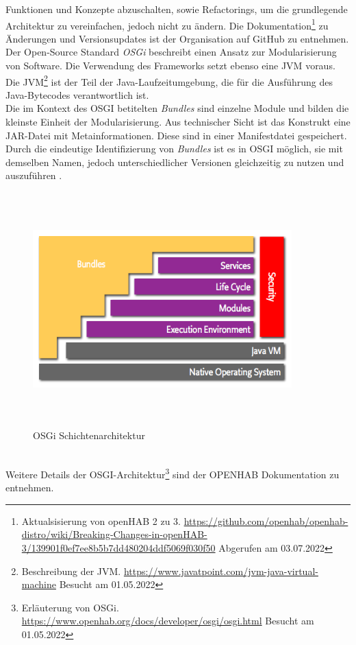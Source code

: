    Funktionen und Konzepte abzuschalten, sowie Refactorings, um die grundlegende Architektur zu vereinfachen, jedoch nicht zu ändern. 
    Die Dokumentation\footnote{Aktualsisierung von openHAB 2 zu 3. \url{https://github.com/openhab/openhab-distro/wiki/Breaking-Changes-in-openHAB-3/139901f0ef7ee8b5b7dd480204ddf5069f030f50} Abgerufen am 03.07.2022} 
    zu Änderungen und Versionsupdates ist der Organisation auf GitHub zu entnehmen.
    \\
    \linebreak
    Der Open-Source Standard \textit{OSGi} beschreibt einen Ansatz zur Modularisierung von Software. Die Verwendung des 
    Frameworks setzt ebenso eine \ac{JVM} voraus. 
    Die \acl{JVM}\footnote{Beschreibung der JVM. \url{https://www.javatpoint.com/jvm-java-virtual-machine} Besucht am 01.05.2022} 
    ist der Teil der Java-Laufzeitumgebung, die für die Ausführung des Java-Bytecodes verantwortlich ist.
    \\
    Die im Kontext des \acs{OSGI} betitelten \textit{Bundles} sind einzelne Module und bilden die kleinste Einheit der Modularisierung. Aus technischer Sicht ist 
    das Konstrukt eine \ac{JAR}-Datei mit Metainformationen. Diese sind in einer Manifestdatei gespeichert. Durch die eindeutige 
    Identifizierung von \textit{Bundles} ist es in \acs{OSGI} möglich, sie mit demselben Namen, jedoch unterschiedlicher 
    Versionen gleichzeitig zu nutzen und auszuführen \cite{openHAB-article}. 
    \begin{figure}[hbt!]
        \centering
        \includegraphics[width=10cm,height=9cm,keepaspectratio]{images/osgi-architecture.png}
        \caption{OSGi Schichtenarchitektur \cite{openhab-osgi}}
        \label{fig:osgilayer}
    \end{figure}
    \\
    Weitere Details der \acs{OSGI}-Architektur\footnote{Erläuterung von OSGi. \url{https://www.openhab.org/docs/developer/osgi/osgi.html} Besucht am 01.05.2022} 
    sind der \acs{OPENHAB} Dokumentation zu entnehmen.

